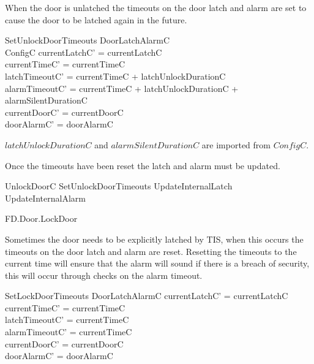 When the door is unlatched the timeouts on the door
latch and alarm are set to cause the door to be latched again in the future. 

\begin{schema}{SetUnlockDoorTimeouts}
        \Delta DoorLatchAlarmC
\\      ConfigC
\where
        currentLatchC' = currentLatchC
\\      currentTimeC' = currentTimeC
\\      latchTimeoutC' = currentTimeC + latchUnlockDurationC
\\      alarmTimeoutC' = currentTimeC + latchUnlockDurationC + alarmSilentDurationC
\\      currentDoorC' = currentDoorC
\\      doorAlarmC' = doorAlarmC
\end{schema}
\begin{Zcomment}
\item
$latchUnlockDurationC$ and $alarmSilentDurationC$ are imported from $ConfigC$.
\end{Zcomment}

Once the timeouts have been reset the latch and alarm must be updated.

\begin{zed}
        UnlockDoorC  SetUnlockDoorTimeouts \semi UpdateInternalLatch
        \semi UpdateInternalAlarm
\end{zed}

\begin{traceunit}{FD.Door.LockDoor}
\end{traceunit}

Sometimes the door needs to be explicitly latched by TIS,
when this occurs the timeouts on the door
latch and alarm are reset. 
Resetting the timeouts to the current time will ensure that the alarm
will sound if there is a breach of security, this will occur through
checks on the alarm timeout.

\begin{schema}{SetLockDoorTimeouts}
        \Delta DoorLatchAlarmC
\where
        currentLatchC' = currentLatchC
\\      currentTimeC' = currentTimeC
\\      latchTimeoutC' = currentTimeC
\\      alarmTimeoutC' = currentTimeC 
\\      currentDoorC' = currentDoorC
\\      doorAlarmC' = doorAlarmC
\end{schema}

